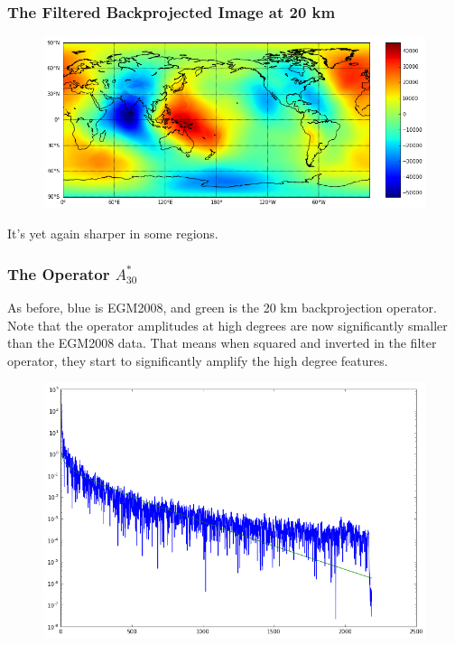 \documentclass[aspectratio=43,mathserif]{beamer}
\begin{document}
\begin{frame}

\frametitle{The Filtered Backprojected Image at 20 km}

\begin{figure}
\includegraphics[width=0.9\linewidth]{FBP20.png}
\end{figure}

It's yet again sharper in some regions.
\end{frame}

\begin{frame}
\frametitle{The Operator \(A_{30}^*\)}

As before, blue is EGM2008, and green is the 20 km backprojection operator. Note that the operator amplitudes at high degrees are now significantly smaller than the EGM2008 data. That means when squared and inverted in the filter operator, they start to significantly amplify the high degree features.

\begin{figure}
\includegraphics[width=0.65\linewidth]{1_r_30.png}
\end{figure}
\end{frame}
\end{document}
